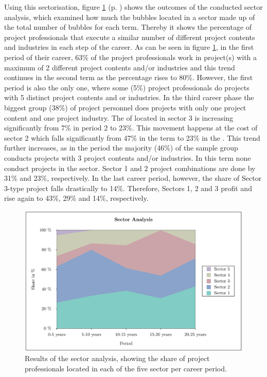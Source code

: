 \noindent Using this sectorisation, figure \ref{fig:sector2} (p. \pageref{fig:sector2}) shows the outcomes of the conducted sector analysis, which examined how much the bubbles located in a sector made up of the total number of bubbles for each term. Thereby it shows the percentage of project professionals that execute a similar number of different project contents and industries in each step of the career. As can be seen in figure \ref{fig:sector2}, in the first period of their career, 63\% of the project professionals work in project(s) with a maximum of 2 different project contents and/or industries and this trend continues in the second term as the percentage rises to 80\%. However, the first period is also the only one, where some (5\%) project professionals do projects with 5 distinct project contents and or industries. In the third career phase the biggest group (38\%) of project personnel does projects with only one project content and one project industry. The of located in sector 3 is increasing significantly from 7\% in period 2 to 23\%. This movement happens at the cost of sector 2 which falls significantly from 47\% in the  term to 23\% in the . This trend further increases, as in the  period the majority (46\%) of the sample group conducts projects with 3 project contents and/or industries. In this term none conduct projects in the  sector. Sector 1 and 2 project combinations are done by 31\% and 23\%, respectively. In the last career period, however, the share of Sector 3-type project falls drastically to 14\%. Therefore, Sectors 1, 2 and 3 profit and rise again to 43\%, 29\% and 14\%, respectively. \\


\begin{figure}[hbt]
    \captionsetup{font=small}
  \centering
  \includegraphics[width=.6\columnwidth]{figures/Analysis_sectors2.png}
  \caption[Results of the sector analysis]{Results of the sector analysis, showing the share of project professionals located in each of the five sector per career period.}
  \label{fig:sector2}
\end{figure}



